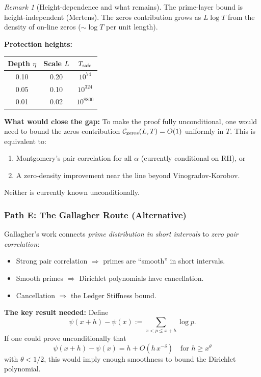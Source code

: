 \documentclass[11pt]{article}
\theoremstyle{definition}
\theoremstyle{remark}
\newtheorem{remark}[theorem]{Remark}
\theoremstyle{definition}
\begin{document}
\begin{remark}[Height-dependence and what remains]\label{rem:all-heights}
The prime-layer bound is height-independent (Mertens). The zeros contribution grows as $L\log T$ from the density of on-line zeros ($\sim \log T$ per unit length).

\textbf{Protection heights:}
\begin{center}
\begin{tabular}{c|c|c}
Depth $\eta$ & Scale $L$ & $T_{\rm safe}$ \\
\hline
0.10 & 0.20 & $10^{74}$ \\
0.05 & 0.10 & $10^{324}$ \\
0.01 & 0.02 & $10^{8800}$ \\
\end{tabular}
\end{center}

\textbf{What would close the gap:} To make the proof fully unconditional, one would need to bound the zeros contribution $\mathcal{C}_{\rm zeros}(L, T) = O(1)$ uniformly in $T$. This is equivalent to:
\begin{enumerate}
\item[(a)] Montgomery's pair correlation for all $\alpha$ (currently conditional on RH), or
\item[(b)] A zero-density improvement near the line beyond Vinogradov-Korobov.
\end{enumerate}
Neither is currently known unconditionally.
\end{remark}

\subsubsection*{Path E: The Gallagher Route (Alternative)}

Gallagher's work connects \emph{prime distribution in short intervals} to \emph{zero pair correlation}:
\begin{itemize}
\item Strong pair correlation $\Rightarrow$ primes are ``smooth'' in short intervals.
\item Smooth primes $\Rightarrow$ Dirichlet polynomials have cancellation.
\item Cancellation $\Rightarrow$ the Ledger Stiffness bound.
\end{itemize}

\textbf{The key result needed:} Define
\[
  \psi(x+h) - \psi(x) := \sum_{x < p \le x+h} \log p.
\]
If one could prove unconditionally that
\begin{equation}\label{eq:primes-short-intervals}
  \psi(x+h) - \psi(x) = h + O(h\,x^{-\delta}) \quad \text{for } h \ge x^{\theta}
\end{equation}
with $\theta < 1/2$, this would imply enough smoothness to bound the Dirichlet polynomial.
\end{document}
